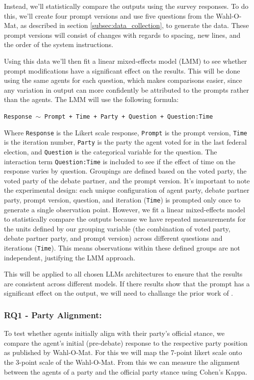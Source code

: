 \documentclass[12pt]{article}
\begin{document}
\begin{multicols}{2}
Instead, we'll statistically compare the outputs using the survey responses. To do this, we'll create four prompt versions and use five questions from the Wahl-O-Mat, as described in section \ref{subsec:data_collection}, to generate the data. These prompt versions will consist of changes with regards to spacing, new lines, and the order of the system instructions. 
 
Using this data we'll then fit a linear mixed-effects model (LMM) to see whether prompt modifications have a significant effect on the results. This will be done using the same agents for each question, which makes comparisons easier, since any variation in output can more confidently be attributed to the prompts rather than the agents. The LMM will use the following formula:

\texttt{Response $\sim$ Prompt + Time + Party + Question + Question:Time}

Where \texttt{Response} is the Likert scale response, \texttt{Prompt} is the prompt version, \texttt{Time} is the iteration number, \texttt{Party} is the party the agent voted for in the last federal election, and \texttt{Question} is the categorical variable for the question. The interaction term \texttt{Question:Time} is included to see if the effect of time on the response varies by question. Groupings are defined based on the voted party, the voted party of the debate partner, and the prompt version. It's important to note the experimental design: each unique configuration of agent party, debate partner party, prompt version, question, and iteration (\texttt{Time}) is prompted only once to generate a single observation point. However, we fit a linear mixed-effects model to statistically compare the outputs because we have repeated measurements for the units defined by our grouping variable (the combination of voted party, debate partner party, and prompt version) across different questions and iterations (\texttt{Time}). This means observations within these defined groups are not independent, justifying the LMM approach.

This will be applied to all chosen LLMs architectures to ensure that the results are consistent across different models. If there results show that the prompt has a significant effect on the output, we will need to challange the prior work of .

\subsubsection{RQ1 - Party Alignment:}
To test whether agents initially align with their party's official stance, we compare the agent's initial (pre-debate) response to the respective party position as published by Wahl-O-Mat. For this we will map the 7-point likert scale onto the 3-point scale of the Wahl-O-Mat. From this we can measure the alignment between the agents of a party and the official party stance using Cohen's Kappa.




\end{multicols}
\end{document}
